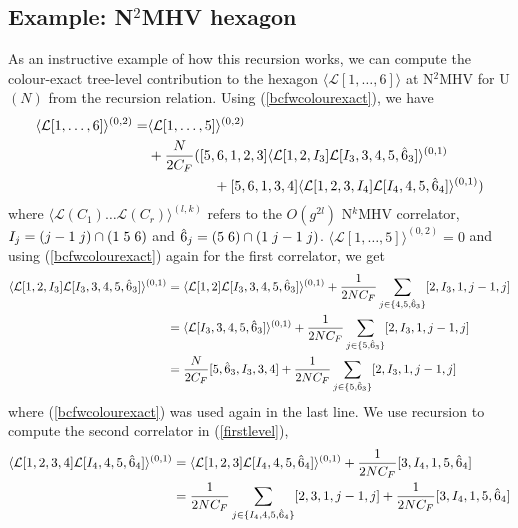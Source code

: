 \documentclass[12pt]{article}
\numberwithin{equation}{section}
\begin{document}
\subsection{Example: N\texorpdfstring{\(^2\)}{2}MHV hexagon}

As an instructive example of how this recursion works, we can compute the colour-exact tree-level contribution to the hexagon $\langle \mathcal{L}[1,\hdots,6]\rangle$ at N\(^2\)MHV for U$(N)$ from the recursion relation. Using (\ref{bcfwcolourexact}), we have
\begin{align}
    \langle \mathcal{L}[1,\hdots,6]\rangle^{(0,2)} = & \langle \mathcal{L}[1,\hdots,5]\rangle^{(0,2)}\notag\\
    &+\frac{N}{2C_F}( [5,6,1,2,3]\langle \mathcal{L}[1,2,I_3]\mathcal{L}[I_3,3,4,5,\hat{6}_3]\rangle^{(0,1)}\notag\\
    &\hspace{16.5mm}+ [5,6,1,3,4]\langle \mathcal{L}[1,2,3,I_4]\mathcal{L}[I_4,4,5,\hat{6}_4]\rangle^{(0,1)} )
    \label{firstlevel}
\end{align}
where $\langle \mathcal{L}(C_1) \hdots \mathcal{L}(C_r)\rangle^{(l,k)}$ refers to the $O(g^{2l})$ N$^k$MHV correlator, $I_j=(j-1 \hspace{1mm} j)\cap (1 \hspace{1mm} 5 \hspace{1mm} 6)$ and $\hat{6}_j=(5 \hspace{1mm} 6)\cap (1 \hspace{1mm} j-1 \hspace{1mm} j)$. $\langle \mathcal{L}[1,\hdots,5]\rangle^{(0,2)}=0$ and using (\ref{bcfwcolourexact}) again for the first correlator, we get
\begin{align}
    \langle \mathcal{L}[1,2,I_3]\mathcal{L}[I_3,3,4,5,\hat{6}_3]\rangle^{(0,1)}& =\langle \mathcal{L}[1,2]\mathcal{L}[I_3,3,4,5,\hat{6}_3]\rangle^{(0,1)}+\frac{1}{2N C_F}\sum_{j\in \{4,5,\hat{6}_3\}}[2,I_3,1,j-1,j]\notag\\
    & =\langle\mathcal{L}[I_3,3,4,5,\hat{6}_3]\rangle^{(0,1)}+\frac{1}{2N C_F}\sum_{j\in \{5,\hat{6}_3\}}[2,I_3,1,j-1,j]\notag\\
    & =\frac{N}{2C_F}[5,\hat{6}_3,I_3,3,4]+\frac{1}{2N C_F}\sum_{j\in \{5,\hat{6}_3\}}[2,I_3,1,j-1,j]
\end{align}
where (\ref{bcfwcolourexact}) was used again in the last line. We use recursion to compute the second correlator in (\ref{firstlevel}),
\begin{align}
    \langle \mathcal{L}[1,2,3,4]\mathcal{L}[I_4,4,5,\hat{6}_4]\rangle^{(0,1)}& =\langle \mathcal{L}[1,2,3]\mathcal{L}[I_4,4,5,\hat{6}_4]\rangle^{(0,1)}+\frac{1}{2N C_F}[3,I_4,1,5,\hat{6}_4]\notag\\
    &=\frac{1}{2N C_F }\sum_{j\in \{I_4,4,5,\hat{6}_4\}}[2,3,1,j-1,j]+\frac{1}{2N C_F}[3,I_4,1,5,\hat{6}_4]\notag\\
\end{align}
\end{document}
